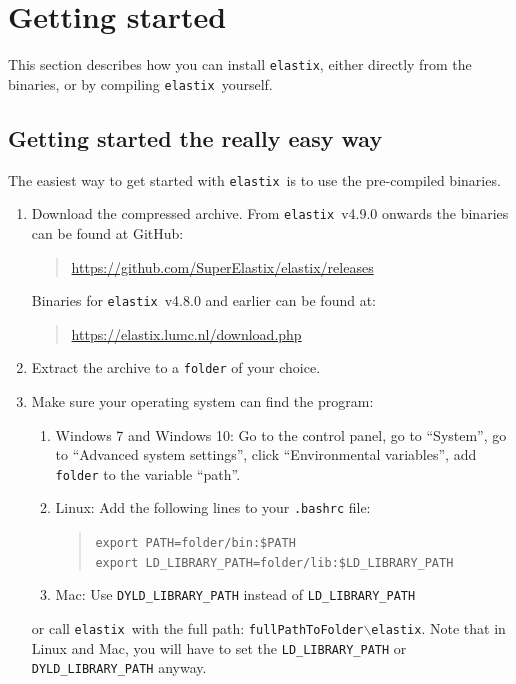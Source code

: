 \documentclass[]{report}
\newcommand{\elastix}{\texttt{elastix}}
\begin{document}
\section{Getting started}\label{sec:elastix:install}

This section describes how you can install \elastix, either directly
from the binaries, or by compiling \elastix\ yourself.

\subsection{Getting started the really easy way}

The easiest way to get started with \elastix\ is to use the
pre-compiled binaries.
\begin{enumerate}
\item Download the compressed archive. From \elastix\ v4.9.0 onwards
the binaries can be found at GitHub:
    \begin{quote}
    \url{https://github.com/SuperElastix/elastix/releases}
    \end{quote}

Binaries for \elastix\ v4.8.0 and earlier can be found at:
    \begin{quote}
    \url{https://elastix.lumc.nl/download.php}
    \end{quote}

\item Extract the archive to a \texttt{folder} of your choice.

\item Make sure your operating system can find the program:
    \begin{enumerate}
    \item Windows 7 and Windows 10: Go to the control panel, go to ``System'', go to
    ``Advanced system settings'', click ``Environmental variables'',
    add \texttt{folder} to the variable ``path''.

    \item Linux: Add the following lines to your \texttt{.bashrc} file:
       \begin{quote}
       \texttt{export PATH=folder/bin:\$PATH}\\
       \texttt{export LD\_LIBRARY\_PATH=folder/lib:\$LD\_LIBRARY\_PATH}
       \end{quote}

    \item Mac: Use \texttt{DYLD\_LIBRARY\_PATH} instead of \texttt{LD\_LIBRARY\_PATH}

    \end{enumerate}
    or call \elastix\ with the full path:
    \texttt{fullPathToFolder$\backslash$elastix}. Note that in Linux and Mac, you
    will have to set the \texttt{LD\_LIBRARY\_PATH} or \texttt{DYLD\_LIBRARY\_PATH} anyway.
\end{enumerate}
\end{document}
